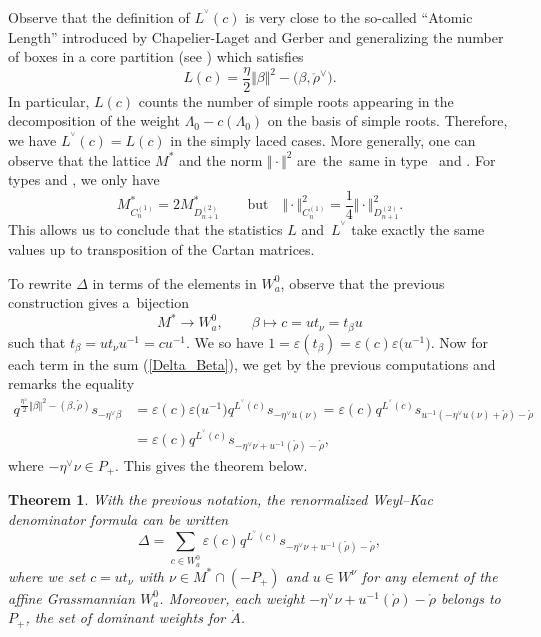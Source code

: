 \documentclass[pdftex]{sigma}
\newtheorem{Theorem}{Theorem}[section]
\numberwithin{equation}{section}
\begin{document}
\begin{Remark}
	\label{rem:reseau} Observe that the definition of $L^{^{\vee}}(c)$ is very
	close to the so-called ``Atomic Length'' introduced by Chapelier-Laget and
	Gerber and generalizing the number of boxes in a core partition (see
	\cite[Corollary~8.2]{CGT}) which satisfies
	\[
	L(c)=\frac{\eta}{2} \Vert \beta \Vert ^{2}-\bigl(\beta,\mathring{\rho}^{\vee}\bigr).
	\]
	In particular, $L(c)$ counts the number of simple roots appearing in the
	decomposition of the weight $\Lambda_{0}-c(\Lambda_{0})$ on the basis of
	simple roots. Therefore, we have $L^{^{\vee}}(c)=L(c)$ in the simply laced
	cases. More generally, one can observe that the lattice $M^{\ast}$ and the
	norm $ \Vert \cdot \Vert ^{2}$ are~the~same in type~ and
	. For types  and ,
    we only have
\[
M_{C_{n}^{(1)}}^{\ast}=2M_{D_{n+1}^{(2)}}^{\ast} \qquad \text{but} \quad \Vert \cdot \Vert _{C_{n}^{(1)}}^{2}=\frac{1}{4} \Vert \cdot \Vert _{D_{n+1}^{(2)}}^{2}.
\]
 This
	allows us to conclude that the statistics $L$ and~$L^{^{\vee}}$ take exactly
	the same values up to transposition of the Cartan matrices.
\end{Remark}

To rewrite $\Delta$ in terms of the elements in $W_{a}^{0}$, observe that the
previous construction gives a~bijection
\begin{equation}
M^{\ast}\rightarrow W_{a}^{0},\qquad
\beta\longmapsto c=ut_{\nu}=t_{\beta}u
 \label{betac}
\end{equation}
such that $t_{\beta}=ut_{\nu}u^{-1}=cu^{-1}$. We so have $1=\varepsilon
(t_{\beta})=\varepsilon(c)\varepsilon\bigl(u^{-1}\bigr)$. Now for each term in the sum
(\ref{Delta_Beta}), we get by the previous computations and remarks the
equality%
\begin{align*}
q^{\frac{\eta^{\vee}}{2} \Vert \beta \Vert ^{2}-(\beta,\mathring
	{\rho})}s_{-\eta^{\vee}\beta}&=\varepsilon(c)\varepsilon\bigl(u^{-1}\bigr)q^{L^{^{\vee}%
	}(c)}s_{-\eta^{\vee}u(\nu)}=\varepsilon(c)q^{L^{^{\vee}}(c)}s_{u^{-1}(
	-\eta^{\vee}u(\nu)+\mathring{\rho}) -\mathring{\rho}}
\\	&=\varepsilon
(c)q^{L^{^{\vee}}(c)}s_{-\eta^{\vee}\nu+u^{-1}(\mathring{\rho})-\mathring
	{\rho}},%
\end{align*}
where $-\eta^{\vee}\nu\in P_{+}$. This gives the theorem below.

\begin{Theorem}
	\label{thm:macdo} With the previous notation, the renormalized Weyl--Kac
	denominator formula can be written
	\[
	\Delta=\sum_{c\in W_{a}^{0}}\varepsilon(c)q^{L^{^{\vee}}(c)}s_{-\eta^{\vee}%
		\nu+u^{-1}(\mathring{\rho})-\mathring{\rho}},%
	\]
	where we set $c=ut_{\nu}$ with $\nu\in M^{\ast}\cap(-P_{+})$ and $u\in W^{\nu
	}$ for any element of the affine Grassmannian $W_{a}^{0}$. Moreover, each
	weight $-\eta^{\vee}\nu+u^{-1}(\mathring{\rho})-\mathring{\rho}$ belongs to
	$P_{+}$, the set of dominant weights for $\mathring{A}$.
\end{Theorem}
\end{document}
